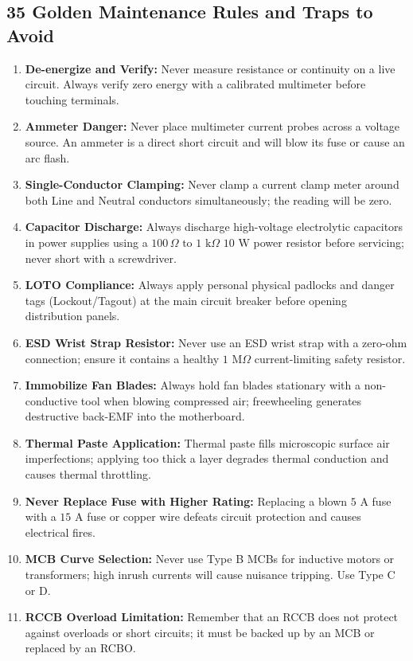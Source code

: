 \subsection{35 Golden Maintenance Rules and Traps to Avoid}
\begin{enumerate}[leftmargin=*]
    \item \textbf{De-energize and Verify:} Never measure resistance or continuity on a live circuit. Always verify zero energy with a calibrated multimeter before touching terminals.
    \item \textbf{Ammeter Danger:} Never place multimeter current probes across a voltage source. An ammeter is a direct short circuit and will blow its fuse or cause an arc flash.
    \item \textbf{Single-Conductor Clamping:} Never clamp a current clamp meter around both Line and Neutral conductors simultaneously; the reading will be zero.
    \item \textbf{Capacitor Discharge:} Always discharge high-voltage electrolytic capacitors in power supplies using a $100\,\Omega\text{ to }1\text{ k}\Omega$ $10\text{ W}$ power resistor before servicing; never short with a screwdriver.
    \item \textbf{LOTO Compliance:} Always apply personal physical padlocks and danger tags (Lockout/Tagout) at the main circuit breaker before opening distribution panels.
    \item \textbf{ESD Wrist Strap Resistor:} Never use an ESD wrist strap with a zero-ohm connection; ensure it contains a healthy $1\text{ M}\Omega$ current-limiting safety resistor.
    \item \textbf{Immobilize Fan Blades:} Always hold fan blades stationary with a non-conductive tool when blowing compressed air; freewheeling generates destructive back-EMF into the motherboard.
    \item \textbf{Thermal Paste Application:} Thermal paste fills microscopic surface air imperfections; applying too thick a layer degrades thermal conduction and causes thermal throttling.
    \item \textbf{Never Replace Fuse with Higher Rating:} Replacing a blown $5\text{ A}$ fuse with a $15\text{ A}$ fuse or copper wire defeats circuit protection and causes electrical fires.
    \item \textbf{MCB Curve Selection:} Never use Type B MCBs for inductive motors or transformers; high inrush currents will cause nuisance tripping. Use Type C or D.
    \item \textbf{RCCB Overload Limitation:} Remember that an RCCB does not protect against overloads or short circuits; it must be backed up by an MCB or replaced by an RCBO.

\end{enumerate}
